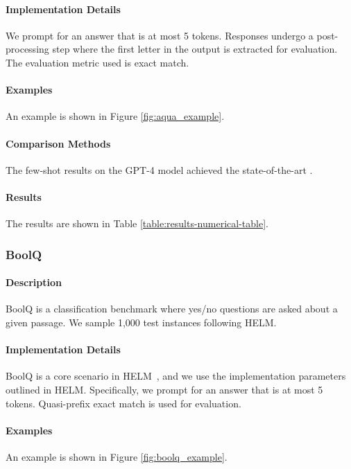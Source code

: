 \paragraph{Implementation Details}
We prompt for an answer that is at most 5 tokens. Responses undergo a post-processing step where the first letter in the output is extracted for evaluation. The evaluation metric used is exact match.

\paragraph{Examples} An example is shown in Figure \ref{fig:aqua_example}.

\paragraph{Comparison Methods}
The few-shot results on the GPT-4 model achieved the state-of-the-art \citep{zheng2023progressivehint}.

\paragraph{Results} The results are shown in Table \ref{table:results-numerical-table}.

\subsubsection{BoolQ}
\paragraph{Description} BoolQ \citep{clark2019boolq} is a classification benchmark where yes/no questions are asked about a given passage. We sample 1,000 test instances following HELM.

\paragraph{Implementation Details}
BoolQ is a core scenario in HELM~\citep{liang2022holistic}, and we use the implementation parameters outlined in HELM. Specifically, we prompt for an answer that is at most 5 tokens. Quasi-prefix exact match is used for evaluation.


\paragraph{Examples} An example is shown in Figure \ref{fig:boolq_example}.

